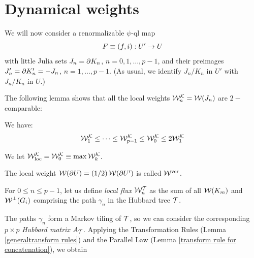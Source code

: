 
 \section{Dynamical weights}
 

We will now consider a renormalizable $\psi$-ql map
$$  F\equiv (f,i): U' \rightarrow U $$
with little  Julia sets $ J_n =\partial K_n $, $n=0, 1, \dots, p-1$, and their
preimages $J_n' = \partial K_n' = -J_n$, $n=1,\dots, p-1$.
(As usual, we identify $J_n/ K_n$  in $U'$ with $J_n/K_n$ in $U$.)

The following lemma shows that 
all the local weights ${\mathcal W}_n^{\mathcal K} = {\mathcal W} (J_n) $ are $2-$comparable:  

   
\begin{lem}\label{comparison of dyn loc w}
We have:
$$
       {\mathcal W}_1^{\mathcal K} \leq \dots \leq {\mathcal W}_{p-1}^{\mathcal K}  \leq {\mathcal W}_0^{\mathcal K} \leq 2{\mathcal W}_1^{\mathcal K}
$$
\end{lem}


We let ${\mathcal W}_{\mathrm{loc}}^{\mathcal K} =  {\mathcal W}_0^{\mathcal K} \equiv \max {\mathcal W}_k^{\mathcal K} $.

The local weight ${\mathcal W}(\partial U)= (1/2) \, {\mathcal W}(\partial U') $
is called ${\mathcal W}^{\mathrm {ver}}$.

%


For $0\leq n\leq p-1$, 
let us define {\em local flux}  ${\mathcal W}_n^{\mathcal T} $
as the sum of all ${\mathcal W}(K_m)$ and ${\mathcal W}^\perp(G_i)$ comprising the
path $\gamma_n$ in the Hubbard tree ${\mathcal T}$.

  
The paths $\gamma_n$ form a Markov tiling of ${\mathcal T}$,
so we can consider  the corresponding $p\times p$  {\em Hubbard matrix} $A_{\mathcal T}$. 
Applying the Transformation Rules  (Lemma \ref{generaltransform rules})
and the Parallel Law (Lemma \ref{transform rule for concatenation}), we obtain

